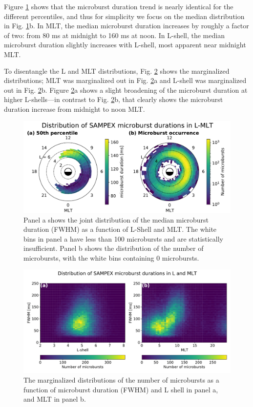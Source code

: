 \documentclass[draft]{agujournal2019}
\begin{document}
Figure \ref{fig3} shows that the microburst duration trend is nearly identical for the different percentiles, and thus for simplicity we focus on the median distribution in Fig. \ref{fig3}b. In MLT, the median microburst duration increases by roughly a factor of two: from 80 ms at midnight to 160 ms at noon. In L-shell, the median microburst duration slightly increases with L-shell, most apparent near midnight MLT.

To disentangle the L and MLT distributions, Fig. \ref{fig4} shows the marginalized distributions; MLT was marginalized out  in Fig. \ref{fig4}a and L-shell was marginalized out in Fig. \ref{fig4}b. Figure \ref{fig4}a shows a slight broadening of the microburst duration at higher L-shells---in contrast to Fig. \ref{fig4}b, that clearly shows the microburst duration increase from midnight to noon MLT.

\begin{figure}
\noindent\includegraphics[width=\textwidth]{figures/fig3.pdf}
\caption{Panel a shows the joint distribution of the median microburst duration (FWHM) as a function of L-Shell and MLT. The white bins in panel a have less than 100 microbursts and are statistically insufficient. Panel b shows the distribution of the number of microbursts, with the white bins containing 0 microbursts.}
\label{fig3}
\end{figure}

\begin{figure}
\noindent\includegraphics[width=\textwidth]{figures/fig4.pdf}
\caption{The marginalized distributions of the number of microbursts as a function of microburst duration (FWHM) and L shell in panel a, and MLT in panel b.}
\label{fig4}
\end{figure}
\end{document}

